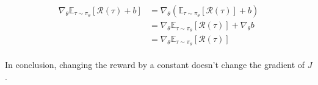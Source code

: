 
\begin{align*}
    \nabla_\theta \mathds{E}_{\tau \sim \pi_\theta} [\mathcal{R}(\tau) + b]
    &= \nabla_\theta \left( \mathds{E}_{\tau \sim \pi_\theta} [\mathcal{R}(\tau)] + b \right) \\
    &= \nabla_\theta \mathds{E}_{\tau \sim \pi_\theta} [\mathcal{R}(\tau)] + \nabla_\theta b \\
    &= \nabla_\theta \mathds{E}_{\tau \sim \pi_\theta} [\mathcal{R}(\tau)]
\end{align*}

\paragraph{}
In conclusion, changing the reward by a constant doesn't change the gradient of $J$.
